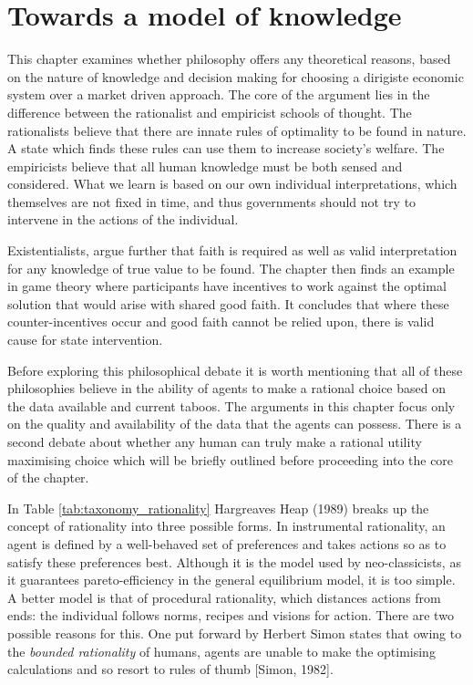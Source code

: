 \chapter{Towards a model of knowledge}

This chapter examines whether philosophy offers any theoretical reasons, based on the nature of knowledge and decision making for choosing a dirigiste economic system over a market driven approach. The core of the argument lies in the difference between the rationalist and empiricist schools of thought. The rationalists believe that there are innate rules of optimality to be found in nature. A state which finds these rules can use them to increase society's welfare. The empiricists believe that all human knowledge must be both sensed and considered. What we learn is based on our own individual interpretations, which themselves are not fixed in time, and thus governments should not try to intervene in the actions of the individual.

Existentialists, argue further that faith is required as well as valid interpretation for any knowledge of true value to be found. The chapter then finds an example in game theory where participants have incentives to work against the optimal solution that would arise with shared good faith. It concludes that where these counter-incentives occur and good faith cannot be relied upon, there is valid cause for state intervention.

Before exploring this philosophical debate it is worth mentioning that all of these philosophies believe in the ability of agents to make a rational choice based on the data available and current taboos. The arguments in this chapter focus only on the quality and availability of the data that the agents can possess. There is a second debate about whether any human can truly make a rational utility maximising choice which will be briefly outlined before proceeding into the core of the chapter.



In Table \ref{tab:taxonomy_rationality} Hargreaves Heap (1989) breaks up the concept of rationality into three possible forms. In instrumental rationality, an agent is defined by a well-behaved set of preferences and takes actions so as to satisfy these preferences best. Although it is the model used by neo-classicists, as it guarantees pareto-efficiency in the general equilibrium model, it is too simple. A better model is that of procedural rationality, which distances actions from ends: the individual follows norms, recipes and visions for action. There are two possible reasons for this. One put forward by Herbert Simon states that owing to the \textit{bounded rationality} of humans, agents are unable to make the optimising calculations and so resort to rules of thumb [Simon, 1982].


